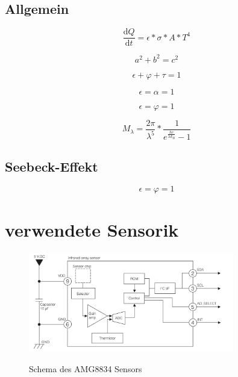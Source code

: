 \subsection{Allgemein}

\begin{equation}
\label{eq1}
\frac{\mathrm{d} Q}{\mathrm{d} t} = \epsilon *\sigma * A * T^4
\end{equation}




\begin{equation}
\label{eq2}
a^2+b^2=c^2
\end{equation}


\begin{equation}
\label{eq3}
\epsilon +\varphi +\tau  = 1
\end{equation}

\begin{equation}
\label{eq4}
\epsilon = \alpha  = 1
\end{equation}

\begin{equation}
\label{eq4}
\epsilon = \varphi  = 1
\end{equation}

\begin{equation}
\label{eq5}
M_{\lambda } = \frac{2\pi}{\lambda^5}*\frac{1}{e^\frac{hc}{\lambda k_{B}}-1}
\end{equation}

\subsection{Seebeck-Effekt}

\begin{equation}
\label{eq4}
\epsilon = \varphi  = 1
\end{equation}




\section{verwendete Sensorik}


\begin{figure}[H]
	\centering
	\includegraphics[width=0.8\textwidth]
	{fig/Circuit_AMG8834.PNG}
	\caption[Schema des AMG8834 Sensors]{Schema des AMG8834 Sensors} \protect\cite{AMG8834}
	\label{fig:SchemaAMG8834}
\end{figure}

